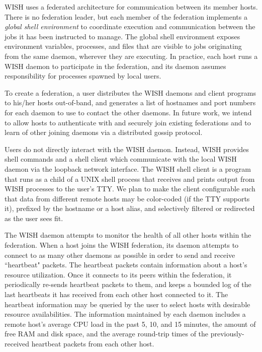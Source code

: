 WISH uses a federated architecture for communication between its member hosts.
There is no federation leader, but each member of the federation implements a
\textit{global shell environment} to coordinate execution and communication
between the jobs it has been instructed to manage.  The global shell
environment exposes environment variables, processes, and files that are
visible to jobs originating from the same daemon, wherever they are executing.
In practice, each host runs a WISH daemon to participate in the federation,
and its daemon assumes responsibility for processes spawned by local users.  

To create a federation, a user distributes the WISH daemons and client
programs to his/her hosts out-of-band, and generates a list of hostnames and
port numbers for each daemon to use to contact the other daemons.  In future
work, we intend to allow hosts to authenticate with and securely join existing
federations and to learn of other joining daemons via a distributed
gossip protocol.


Users do not directly interact with the WISH daemon. Instead, WISH provides
shell commands and a shell client which communicate with the local WISH daemon
via the loopback network interface.  The WISH shell client is a program that
runs as a child of a UNIX shell process that receives and prints output from
WISH processes to the user's TTY.  We plan to make the client configurable
such that data from different remote hosts may be color-coded (if the TTY
supports it), prefixed by the hostname or a host alias, and selectively
filtered or redirected as the user sees fit.


The WISH daemon attempts to monitor the health of all other hosts within the
federation. When a host joins the WISH federation, its daemon attempts to
connect to as many other daemons as possible in order to send and receive
``heartbeat" packets. The heartbeat packets contain information about a host's
resource utilization.  Once it connects to its peers within the federation, it
periodically re-sends heartbeat packets to them, and keeps a bounded log of
the last heartbeats it has received from each other host connected to it.  The
heartbeat information may be queried by the user to select hosts with
desirable resource availabilities.  The information maintained by each daemon
includes a remote host's average CPU load in the past 5, 10, and 15 minutes,
the amount of free RAM and disk space, and the average round-trip times of the
previously-received heartbeat packets from each other host.

